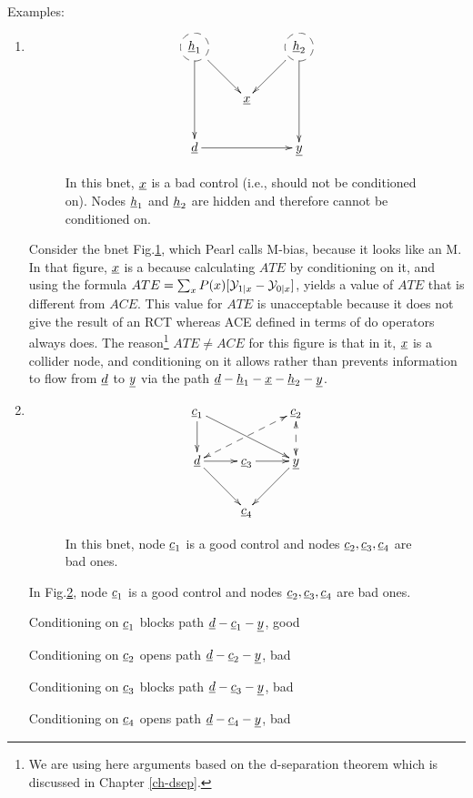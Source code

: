 Examples:

\begin{enumerate}
\item
\begin{figure}[h!]
$$
\xymatrix{
*++[F-o]{\rvh_1} \ar[dd]\ar[dr]
&
& *++[F-o]{\rvh_2}  \ar[dd]\ar[dl]
\\
& \rvx
\\
\rvd \ar[rr]
&&\rvy
}$$
\caption{In this bnet,
$\rvx$ is a bad control
(i.e., should
not be conditioned on).
Nodes $\rvh_1$
and $\rvh_2$ are
hidden and therefore
cannot be conditioned on.}
\label{fig-po-m-bias}
\end{figure}

Consider the
bnet Fig.\ref{fig-po-m-bias},
which  Pearl calls M-bias,
because it looks like an M.
In that figure,
$\rvx$
is a 
because
calculating
$ATE$ by conditioning on it,
and using the formula
$ATE=\sum_x
 P(x)[{\cal Y}_{1|x}-{\cal Y}_{0|x}]$,
yields a value of $ATE$
that is different from
$ACE$. This value for $ATE$
is unacceptable
because it does
not give the result of an RCT
whereas ACE defined
in terms of do operators
always does.
The reason\footnote{We are
using here arguments
based on the d-separation
theorem
which is discussed in Chapter
\ref{ch-dsep}.} $ATE\neq ACE$
for this figure
is that in it,
$\rvx$ is
a collider node,
and conditioning
on it allows
rather than
prevents information
to flow from $\rvd$
to $\rvy$
via the path
$\rvd-\rvh_1-\rvx-\rvh_2-\rvy$.
\item

\begin{figure}[h!]
$$
\xymatrix{
\rvc_1\ar[d]\ar[drr]
&&\rvc_2\ar@{<-->}[d]
\ar@{<-->}[dll]
\\
\rvd\ar[r]\ar[dr]
&\rvc_3\ar[r]
&\rvy\ar[dl]
\\
&\rvc_4
}$$
\caption{In this bnet,
node $\rvc_1$ is a good
control and nodes $\rvc_2, \rvc_3, \rvc_4$
are bad ones.}
\label{fig-po-1-good-3-bad}
\end{figure}

In Fig.\ref{fig-po-1-good-3-bad}, node
$\rvc_1$ is a good
control and nodes $\rvc_2, \rvc_3, \rvc_4$
are bad ones.

Conditioning on $\rvc_1$ blocks path $\rvd-\rvc_1-\rvy$, good

Conditioning on $\rvc_2$ opens path $\rvd-\rvc_2-\rvy$, bad

Conditioning on $\rvc_3$ blocks path $\rvd-\rvc_3-\rvy$, bad

Conditioning on $\rvc_4$ opens path $\rvd-\rvc_4-\rvy$, bad



\end{enumerate}


